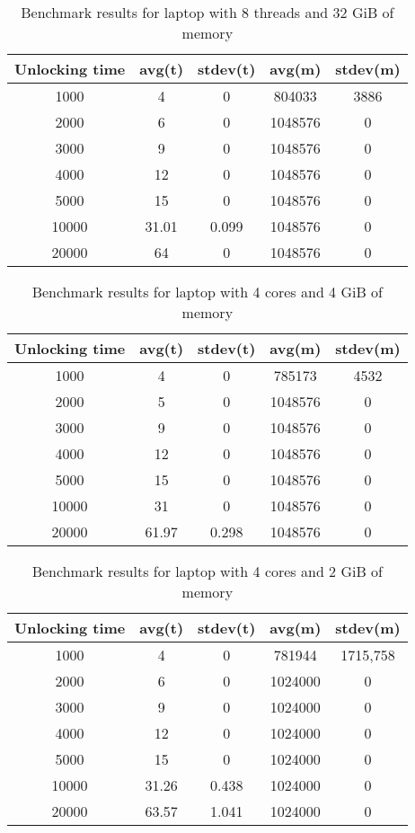 \documentclass[nolof]{fithesis3}
\begin{document}
\noindent
\begin{table}
\caption{Benchmark results for laptop with 8 threads and 32 GiB of memory}
\label{tab:l8c32g}
\begin{tabularx}{\textwidth}{| c | c | c | c | c |}
\hline
Unlocking time & avg(t) & stdev(t) & avg(m) & stdev(m)\\
\hline
1000 & 4 & 0 & 804033 & 3886\\
\hline
2000 & 6 & 0 & 1048576 & 0\\
\hline
3000 & 9 & 0 & 1048576 & 0\\
\hline
4000 & 12 & 0 & 1048576 & 0\\
\hline
5000 & 15 & 0 & 1048576 & 0\\
\hline
10000 & 31.01 & 0.099 & 1048576 & 0\\
\hline
20000 & 64 & 0 & 1048576 & 0\\
\hline
\end{tabularx}
\end{table}

\noindent
\begin{table}
\caption{Benchmark results for laptop with 4 cores and 4 GiB of memory}
\label{tab:l4c4g}
\begin{tabularx}{\textwidth}{| c | c | c | c | c |}
\hline
Unlocking time & avg(t) & stdev(t) & avg(m) & stdev(m)\\
\hline
1000 & 4 & 0 & 785173 & 4532\\
\hline
2000 & 5 & 0 & 1048576 & 0\\
\hline
3000 & 9 & 0 & 1048576 & 0\\
\hline
4000 & 12 & 0 & 1048576 & 0\\
\hline
5000 & 15 & 0 & 1048576 & 0\\
\hline
10000 & 31 & 0 & 1048576 & 0\\
\hline
20000 & 61.97 & 0.298 & 1048576 & 0\\
\hline
\end{tabularx}
\end{table}

\noindent
\begin{table}
\caption{Benchmark results for laptop with 4 cores and 2 GiB of memory}
\label{tab:l4c2g}
\begin{tabularx}{\textwidth}{| c | c | c | c | c |}
\hline
Unlocking time & avg(t) & stdev(t) & avg(m) & stdev(m)\\
\hline
1000 & 4 & 0 & 781944 & 1715,758\\
\hline
2000 & 6 & 0 & 1024000 & 0\\
\hline
3000 & 9 & 0 & 1024000 & 0\\
\hline
4000 & 12 & 0 & 1024000 & 0\\
\hline
5000 & 15 & 0 & 1024000 & 0\\
\hline
10000 & 31.26 & 0.438 & 1024000 & 0\\
\hline
20000 & 63.57 & 1.041 & 1024000 & 0\\
\hline
\end{tabularx}
\end{table}
\end{document}
